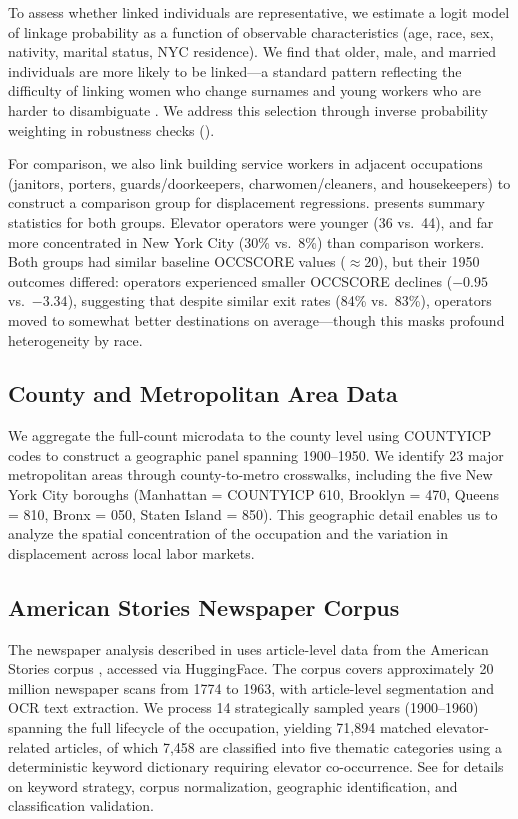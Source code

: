 \documentclass[12pt]{article}
\begin{document}
To assess whether linked individuals are representative, we estimate a logit model of linkage probability as a function of observable characteristics (age, race, sex, nativity, marital status, NYC residence). We find that older, male, and married individuals are more likely to be linked---a standard pattern reflecting the difficulty of linking women who change surnames and young workers who are harder to disambiguate \citep{bailey2020}. We address this selection through inverse probability weighting in robustness checks ().

For comparison, we also link building service workers in adjacent occupations (janitors, porters, guards/doorkeepers, charwomen/cleaners, and housekeepers) to construct a comparison group for displacement regressions.  presents summary statistics for both groups. Elevator operators were younger (36 vs.\ 44), and far more concentrated in New York City (30\% vs.\ 8\%) than comparison workers. Both groups had similar baseline OCCSCORE values ($\approx$20), but their 1950 outcomes differed: operators experienced smaller OCCSCORE declines ($-0.95$ vs.\ $-3.34$), suggesting that despite similar exit rates (84\% vs.\ 83\%), operators moved to somewhat better destinations on average---though this masks profound heterogeneity by race.


\label{tab:sumstats}

\subsection{County and Metropolitan Area Data}

We aggregate the full-count microdata to the county level using COUNTYICP codes to construct a geographic panel spanning 1900--1950. We identify 23 major metropolitan areas through county-to-metro crosswalks, including the five New York City boroughs (Manhattan = COUNTYICP 610, Brooklyn = 470, Queens = 810, Bronx = 050, Staten Island = 850). This geographic detail enables us to analyze the spatial concentration of the occupation and the variation in displacement across local labor markets.

\subsection{American Stories Newspaper Corpus}

The newspaper analysis described in  uses article-level data from the American Stories corpus \citep{dell2023}, accessed via HuggingFace. The corpus covers approximately 20 million newspaper scans from 1774 to 1963, with article-level segmentation and OCR text extraction. We process 14 strategically sampled years (1900--1960) spanning the full lifecycle of the occupation, yielding 71,894 matched elevator-related articles, of which 7,458 are classified into five thematic categories using a deterministic keyword dictionary requiring elevator co-occurrence. See  for details on keyword strategy, corpus normalization, geographic identification, and classification validation.
\end{document}

